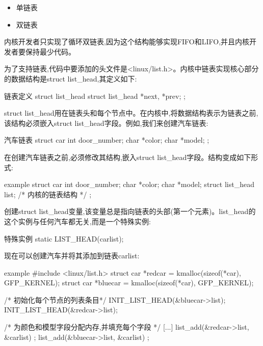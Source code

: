 \documentclass[lang=cn,newtx,10pt,scheme=chinese]{elegantbook}
\begin{document}
\begin{itemize}
    \item 单链表
    \item 双链表
\end{itemize}

内核开发者只实现了循环双链表,因为这个结构能够实现FIFO和LIFO,并且内核开发者要保持最少代码。

为了支持链表,代码中要添加的头文件是<linux/list.h>。内核中链表实现核心部分的数据结构是struct list\_head,其定义如下:

\begin{mycode}{链表定义}
struct list_head {
    struct list_head *next, *prev;
};
\end{mycode}

struct list\_head用在链表头和每个节点中。在内核中,将数据结构表示为链表之前,该结构必须嵌入struct list\_head字段。例如,我们来创建汽车链表:

\begin{mycode}{汽车链表}
struct car {
    int door_number;
    char *color;
    char *model;
};
\end{mycode}

在创建汽车链表之前,必须修改其结构,嵌入struct list\_head字段。结构变成如下形式:

\begin{mycode}{example}
struct car {
    int door_number;
    char *color;
    char *model;
    struct list_head list; /* 内核的链表结构 */
};
\end{mycode}

创建struct list\_head变量,该变量总是指向链表的头部(第一个元素)。list\_head的这个实例与任何汽车都无关,而是一个特殊实例:

\begin{mycode}{特殊实例}
    static LIST_HEAD(carlist);
\end{mycode}

现在可以创建汽车并将其添加到链表carlist:

\begin{mycode}{example}
#include <linux/list.h>
struct car *redcar = kmalloc(sizeof(*car), GFP_KERNEL);
struct car *bluecar = kmalloc(sizeof(*car), GFP_KERNEL);

/* 初始化每个节点的列表条目*/
INIT_LIST_HEAD(&bluecar->list);
INIT_LIST_HEAD(&redcar->list);

/* 为颜色和模型字段分配内存,并填充每个字段 */
[...]
list_add(&redcar->list, &carlist) ;
list_add(&bluecar->list, &carlist) ;
\end{mycode}
\end{document}
